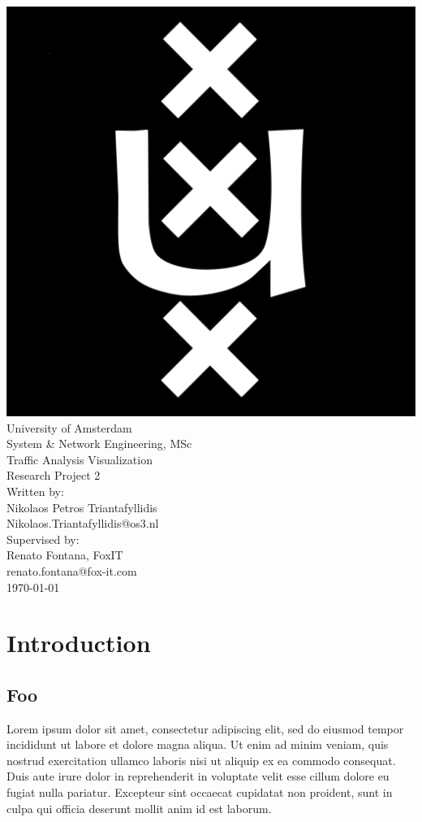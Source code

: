 \documentclass[16pt]{extreport}
\begin{document}
\begin{center}
\includegraphics[scale=0.07]{logo.png}\\
\huge{University of Amsterdam}\\
\huge{System \& Network Engineering, MSc}\\[1cm]
\Huge{Traffic Analysis Visualization}\\[0.2cm] 
\Large{Research Project 2}\\[2cm]
\large{Written by:}\\
\Large{Nikolaos Petros Triantafyllidis}\\
\large{Nikolaos.Triantafyllidis@os3.nl}\\[0.3cm]
\large{Supervised by:}\\
\Large{Renato Fontana, FoxIT}\\
\large{renato.fontana@fox-it.com}\\[5cm]
\today
\end{center}
\thispagestyle{empty}
\clearpage

\newpage
\chapter{Introduction}
\section{Foo}
\large{
Lorem ipsum dolor sit amet, consectetur adipiscing elit, sed do eiusmod tempor incididunt ut labore et dolore magna aliqua. Ut enim ad minim veniam, quis nostrud exercitation ullamco laboris nisi ut aliquip ex ea commodo consequat. Duis aute irure dolor in reprehenderit in voluptate velit esse cillum dolore eu fugiat nulla pariatur. Excepteur sint occaecat cupidatat non proident, sunt in culpa qui officia deserunt mollit anim id est laborum.}
\
\end{document}
